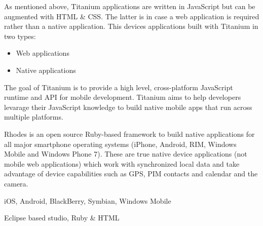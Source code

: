 As mentioned above, Titanium applications are written in JavaScript but can be augmented with HTML \& CSS. The latter is in case a web application is required rather than a native application. This devices applications built with Titanium in two types:
\begin{itemize}
	\item
	Web applications
	\item
	Native applications
\end{itemize}

The goal of Titanium is to provide a high level, cross-platform JavaScript runtime and API for mobile development.\cite{Whinnery2012} Titanium aims to help developers levarage their JavaScript knowledge to build native mobile apps that run across multiple platforms.




Rhodes is an open source Ruby-based framework to build native applications for all major smartphone operating systems (iPhone, Android, RIM, Windows Mobile and Windows Phone 7). These are true native device applications (not mobile web applications) which work with synchronized local data and take advantage of device capabilities such as GPS, PIM contacts and calendar and the camera. %

iOS, Android, BlackBerry, Symbian, Windows Mobile

Eclipse based studio, Ruby \& HTML

